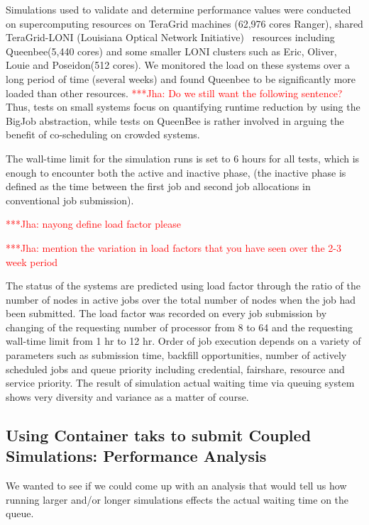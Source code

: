 \documentclass[conference,final]{IEEEtran}
\newcommand{\jhanote}[1]{ {\textcolor{red} { ***Jha: #1 }}}
\newcommand{\jhanote}[1]{}
\begin{document}
Simulations used to validate and determine performance values were
conducted on supercomputing resources on TeraGrid machines (62,976
cores Ranger), shared TeraGrid-LONI (Louisiana Optical Network
Initiative)~\cite{LONI_web} resources including  Queenbee(5,440 cores) and some smaller LONI clusters such as Eric, Oliver, Louie and Poseidon(512 cores).
We monitored the load on these
systems over a long period of time (several weeks) and found Queenbee
to be significantly more loaded than other resources.  \jhanote{Do we
  still want the following sentence?} Thus, tests on small systems
focus on quantifying runtime reduction by using the BigJob
abstraction, while tests on QueenBee is rather involved in arguing the
benefit of co-scheduling on crowded systems.

The wall-time limit for the simulation runs is set to 6 hours for all
tests, which is enough to encounter both the active and inactive
phase, (the inactive phase is defined as the time between the first
job and second job allocations in conventional job submission).

\jhanote{nayong define load factor please}

\jhanote{mention the variation in load factors that you have seen over
  the 2-3 week period}
  

The status of the systems are predicted using load factor through the ratio of the number of nodes in active jobs over the total number of nodes when the job had been submitted. The load factor was recorded on every job submission by changing of the requesting number of processor from 8 to 64 and the requesting wall-time limit from 1 hr to 12 hr. Order of job execution depends on a variety of parameters such as submission time, backfill opportunities, number of actively scheduled jobs and queue priority including credential, fairshare, resource and service priority. The result of simulation actual waiting time via queuing system shows very diversity and variance as a matter of course. 





\subsection{Using Container taks to submit Coupled Simulations:
  Performance Analysis}


We wanted to see if we could come up with an analysis that would tell us how running larger and/or longer simulations effects the actual waiting time on the queue.
\end{document}
